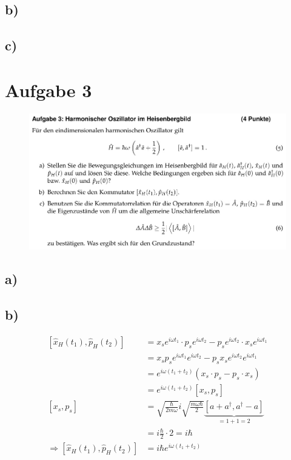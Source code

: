 \subsection{b)}

\subsection{c)}

\section{Aufgabe 3}

    \begin{figure}[H]
        \centering
        \includegraphics[width=\textwidth]{images/Aufgabe3.jpg}
        \label{fig:4}
    \end{figure}

\subsection{a)}

\subsection{b)}

    \begin{align*}
        \left[ \hat{x}_H(t_1),\hat{p}_H(t_2) \right] &= x_s e^{i\omega t_1} \cdot p_s e^{i\omega t_2} - p_s e^{i\omega t_2} \cdot x_s e^{i\omega t_1}\\
        &= x_s p_s e^{i\omega t_1} e^{i\omega t_2} - p_s x_s e^{i\omega t_2} e^{i\omega t_1}\\
        &= e^{i\omega (t_1+t_2)} (x_s \cdot p_s - p_s \cdot x_s)\\
        &= e^{i\omega (t_1+t_2)}[x_s,p_s]\\
        [x_s,p_s] &= \sqrt{\frac{\hbar}{2m\omega}}i \sqrt{\frac{m\omega\hbar}{2}} \underbrace{[a+a^{\dagger},a^{\dagger}-a]}_{=1+1=2}\\
        &= i\frac{\hbar}{2} \cdot 2 = i\hbar\\
        \Rightarrow \left[ \hat{x}_H(t_1),\hat{p}_H(t_2) \right] &= i\hbar e^{i\omega (t_1+t_2)}
    \end{align*}

